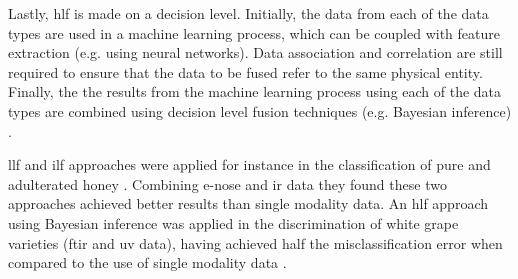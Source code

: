 Lastly, \gls{hlf} is made on a decision level. Initially, the data from each of the data types are used in a machine learning process, which can be coupled with feature extraction (e.g. using neural networks). Data association and correlation are still required to ensure that the data to be fused refer to the same physical entity. Finally, the the results from the machine learning process using each of the data types are combined using decision level fusion techniques (e.g. Bayesian inference) \citep{fourati2015multisensor}.

\gls{llf} and \gls{ilf} approaches were applied for instance in the classification of pure and adulterated honey \citep{norazian2012hybrid}. Combining e-nose and \gls{ir} data they found these two approaches achieved better results than single modality data. An \gls{hlf} approach using Bayesian inference was applied in the discrimination of white grape varieties (\gls{ftir} and \gls{uv} data), having achieved half the misclassification error when compared to the use of single modality data \citep{roussel2003fusion}.





